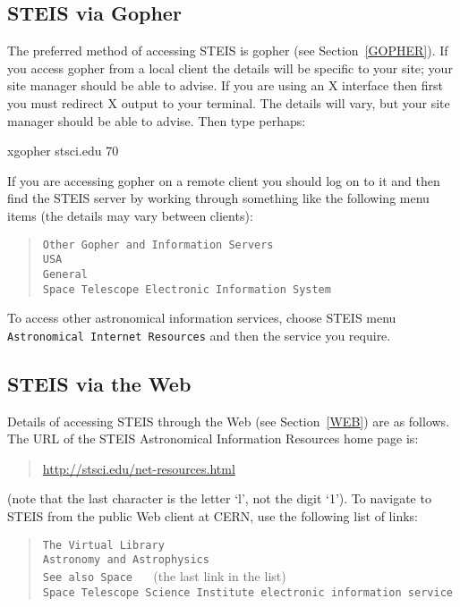 \documentclass[twoside,11pt,nolof]{starlink}
\begin{document}
\subsection{STEIS via Gopher
\label{STEIS_GOPHER}}

The preferred method of accessing STEIS is gopher (see
Section~\ref{GOPHER}). If you access gopher from a local client the
details will be specific to your site; your site manager should be
able to advise. If you are using an X interface then first you must
redirect X output to your terminal. The details will vary, but your site
manager should be able to advise. Then type perhaps:

\begin{terminalv}
xgopher stsci.edu 70
\end{terminalv}

If you are accessing gopher on a remote client you should log on to it
and then find the STEIS server by working through something like the
following menu items (the details may vary between clients):

\begin{verse}
\texttt{Other Gopher and Information Servers  \\
USA  \\
General  \\
Space Telescope Electronic Information System}
\end{verse}

To access other astronomical information services, choose STEIS menu
\texttt{Astronomical Internet Resources} and then the service you require.

\subsection{STEIS via the Web
\label{STEIS_WEB}}

Details of accessing STEIS through the Web (see Section~\ref{WEB}) are
as follows. The URL of the STEIS Astronomical Information Resources
home page is:

\begin{quote}
\url{http://stsci.edu/net-resources.html}
\end{quote}

(note that the last character is the letter `l', not the digit `1').
To navigate to STEIS from the public Web client at CERN, use the
following list of links:

\begin{verse}
\texttt{The Virtual Library  \\
Astronomy and Astrophysics  \\
See also Space} ~~ (the last link in the list)  \\
\texttt{Space Telescope Science Institute electronic information service}\\
\end{verse}
\end{document}
